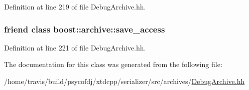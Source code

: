 Definition at line 219 of file Debug\-Archive.\-hh.

\hypertarget{classxtd_1_1serializer_1_1DebugBinOArchive_aaca003bb8a4fc59424e4025130da4edd}{
\subsubsection[{boost\-::archive\-::save\-\_\-access}]{\setlength{\rightskip}{0pt plus 5cm}friend class boost\-::archive\-::save\-\_\-access\hspace{0.3cm}{\ttfamily [friend]}}}\label{classxtd_1_1serializer_1_1DebugBinOArchive_aaca003bb8a4fc59424e4025130da4edd}


Definition at line 221 of file Debug\-Archive.\-hh.



The documentation for this class was generated from the following file\-:\begin{DoxyCompactItemize}
\item 
/home/travis/build/psycofdj/xtdcpp/serializer/src/archives/\hyperlink{DebugArchive_8hh}{Debug\-Archive.\-hh}\end{DoxyCompactItemize}
